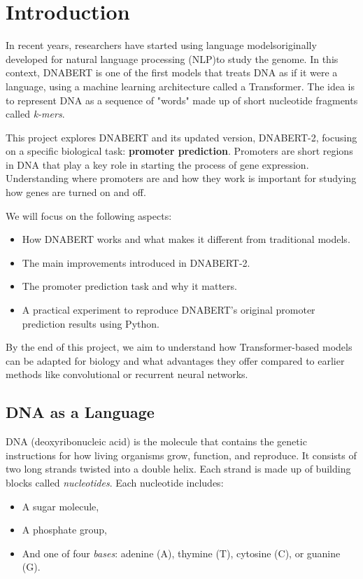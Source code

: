 \section{Introduction}

In recent years, researchers have started using language models\textemdash originally developed for natural language processing (NLP)\textemdash to study the genome. In this context, DNABERT is one of the first models that treats DNA as if it were a language, using a machine learning architecture called a Transformer. The idea is to represent DNA as a sequence of "words" made up of short nucleotide fragments called \textit{k-mers}.

This project explores DNABERT and its updated version, DNABERT-2, focusing on a specific biological task: \textbf{promoter prediction}. Promoters are short regions in DNA that play a key role in starting the process of gene expression. Understanding where promoters are and how they work is important for studying how genes are turned on and off.

We will focus on the following aspects:
\begin{itemize}
\item How DNABERT works and what makes it different from traditional models.
\item The main improvements introduced in DNABERT-2.
\item The promoter prediction task and why it matters.
\item A practical experiment to reproduce DNABERT's original promoter prediction results using Python.
\end{itemize}

By the end of this project, we aim to understand how Transformer-based models can be adapted for biology and what advantages they offer compared to earlier methods like convolutional or recurrent neural networks.

\subsection{DNA as a Language}

DNA (deoxyribonucleic acid) is the molecule that contains the genetic instructions for how living organisms grow, function, and reproduce. It consists of two long strands twisted into a double helix. Each strand is made up of building blocks called \textit{nucleotides}. Each nucleotide includes:
\begin{itemize}
\item A sugar molecule,
\item A phosphate group,
\item And one of four \textit{bases}: adenine (A), thymine (T), cytosine (C), or guanine (G).
\end{itemize}

